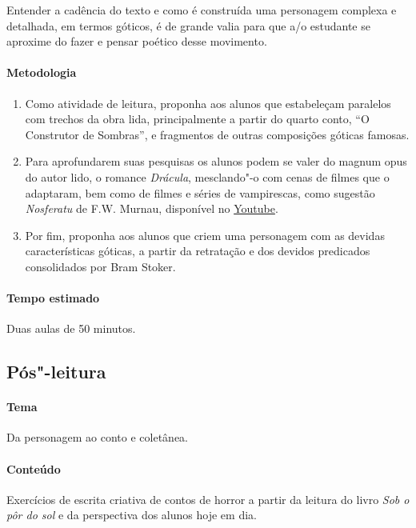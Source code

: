 \documentclass[12pt]{extarticle}
\begin{document}
Entender a cadência do texto e como é construída uma personagem complexa e detalhada, em 
termos góticos, é de grande valia para que a/o estudante se aproxime do fazer e pensar poético 
desse movimento. 

\paragraph{Metodologia}


\begin{enumerate}
\item
Como atividade de leitura, proponha aos alunos que estabeleçam paralelos com trechos da obra
lida, principalmente a partir do quarto conto, ``O Construtor de Sombras'', e fragmentos de outras 
composições góticas famosas. 

\item
Para aprofundarem suas pesquisas os alunos podem se valer do magnum opus do autor lido, o romance 
\emph{Drácula}, mesclando"-o com cenas de filmes que o adaptaram, bem como de filmes e séries de
vampirescas, como sugestão \emph{Nosferatu} de F.W. Murnau, disponível no \href{https://www.youtube.com/watch?v=FC6jFoYm3xs&ab_channel=TimelessClassicMovies}{Youtube}.


\item
Por fim, proponha aos alunos que criem uma personagem com as devidas características góticas, 
a partir da retratação e dos devidos predicados consolidados por Bram Stoker.
 
\end{enumerate}

\paragraph{Tempo estimado} Duas aulas de 50 minutos. 

\subsection{Pós"-leitura}

\paragraph{Tema} Da personagem ao conto e coletânea. 

\paragraph{Conteúdo} Exercícios de escrita criativa de contos de horror a partir
da leitura do livro \emph{Sob o pôr do sol} e da perspectiva dos alunos hoje em dia.
\end{document}
